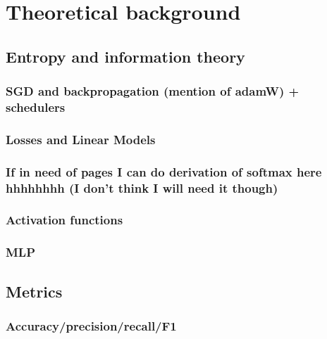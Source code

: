 \chapter{Theoretical background}

\section{Entropy and information theory}
\subsection{SGD and backpropagation (mention of adamW) + schedulers}
\subsection{Losses and Linear Models}
\subsection{If in need of pages I can do derivation of softmax here hhhhhhhh (I don't think I will need it though)}
\subsection{Activation functions}
\subsection{MLP}


\section{Metrics}
\subsection{Accuracy/precision/recall/F1}

